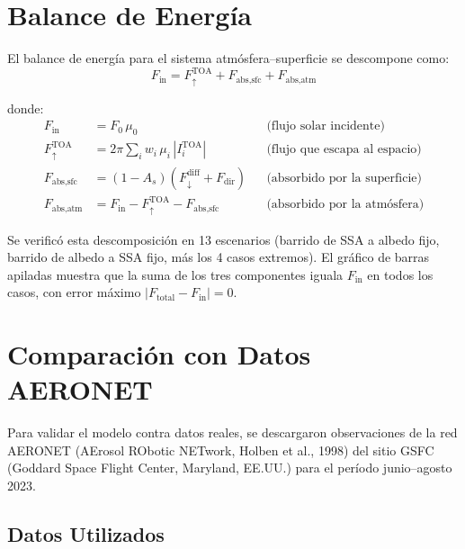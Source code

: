 \documentclass[a4paper,11pt]{article}
\begin{document}
\section{Balance de Energ\'ia}\label{sec:energy_balance}

El balance de energ\'ia para el sistema atm\'osfera--superficie se descompone como:
\begin{equation}\label{eq:energy_balance}
    \boxed{F_{\text{in}} = F_\uparrow^{\text{TOA}} + F_{\text{abs,sfc}} + F_{\text{abs,atm}}}
\end{equation}

donde:
\begin{align}
    F_{\text{in}} &= F_0\,\mu_0 & &\text{(flujo solar incidente)} \\
    F_\uparrow^{\text{TOA}} &= 2\pi\sum_i w_i\,\mu_i\,|I_i^{\text{TOA}}|
        & &\text{(flujo que escapa al espacio)} \\
    F_{\text{abs,sfc}} &= (1-A_s)\left(F_{\downarrow}^{\text{diff}} + F_{\text{dir}}\right)
        & &\text{(absorbido por la superficie)} \\
    F_{\text{abs,atm}} &= F_{\text{in}} - F_\uparrow^{\text{TOA}} - F_{\text{abs,sfc}}
        & &\text{(absorbido por la atm\'osfera)}
\end{align}

Se verific\'o esta descomposici\'on en 13 escenarios (barrido de SSA a albedo fijo,
barrido de albedo a SSA fijo, m\'as los 4 casos extremos). El gr\'afico de barras
apiladas muestra que la suma de los tres componentes iguala $F_{\text{in}}$ en todos
los casos, con error m\'aximo $|F_{\text{total}} - F_{\text{in}}| = 0$.


\section{Comparaci\'on con Datos AERONET}\label{sec:aeronet}

Para validar el modelo contra datos reales, se descargaron observaciones de la
red AERONET (AErosol RObotic NETwork, Holben et al., 1998) del sitio GSFC
(Goddard Space Flight Center, Maryland, EE.UU.) para el per\'iodo
junio--agosto 2023.

\subsection{Datos Utilizados}
\end{document}
